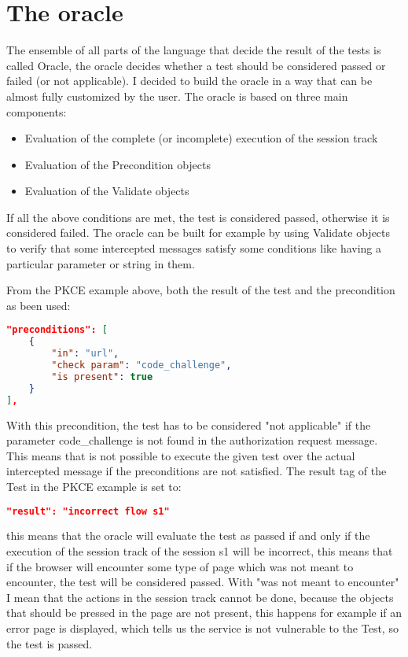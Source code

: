 \section{The oracle}
The ensemble of all parts of the language that decide the result of the tests is called Oracle,
the oracle decides whether a test should be considered passed or failed (or not applicable). I decided to build the oracle in a way that can be almost fully customized by the user. 
The oracle is based on three main components:
\begin{itemize}
    \item Evaluation of the complete (or incomplete) execution of the \gls{session track} 
    \item Evaluation of the Precondition objects
    \item Evaluation of the Validate objects
\end{itemize}
If all the above conditions are met, the test is considered passed, otherwise it is considered failed.
The oracle can be built for example by using Validate objects to verify that some intercepted messages satisfy some conditions like having a particular parameter or string in them.

From the PKCE example above, both the result of the test and the precondition as been used:
\begin{lstlisting}[language=json]
"preconditions": [
    {
        "in": "url",
        "check param": "code_challenge",
        "is present": true
    }
],
\end{lstlisting}
With this precondition, the test has to be considered "not applicable" if the parameter code\_challenge is not found in the authorization request message. This means that is not possible to execute the given test over the actual intercepted message if the preconditions are not satisfied.
The result tag of the Test in the PKCE example is set to:
\begin{lstlisting}[language=json]
"result": "incorrect flow s1"
\end{lstlisting}
this means that the oracle will evaluate the test as passed if and only if the execution of the \gls{session track} of the session s1 will be incorrect, this means that if the browser will encounter some type of page which was not meant to encounter, the test will be considered passed. With "was not meant to encounter" I mean that the actions in the \gls{session track} cannot be done, because the objects that should be pressed in the page are not present, this happens for example if an error page is displayed, which tells us the service is not vulnerable to the Test, so the test is passed.

